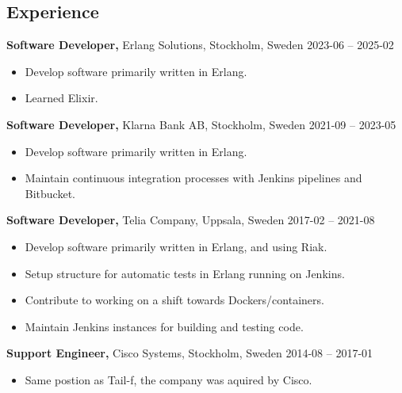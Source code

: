 \documentclass[margin]{res}
\begin{document}

\address{{\bf Contact information}\\
  
  linkedin.com/in/tommymattsson\\
  github.com/Taddic\\
}

\address{{\bf Address}\\
  \\
}

\begin{resume}

\section{Experience}
{\bf Software Developer,} Erlang Solutions, Stockholm, Sweden \hfill 2023-06 -- 2025-02
 \begin{itemize} \itemsep -2pt  %
 \item Develop software primarily written in Erlang.
 \item Learned Elixir.
 \end{itemize}

{\bf Software Developer,} Klarna Bank AB, Stockholm, Sweden \hfill 2021-09 -- 2023-05
 \begin{itemize} \itemsep -2pt  %
 \item Develop software primarily written in Erlang.
 \item Maintain continuous integration processes with Jenkins pipelines and Bitbucket.
 \end{itemize}

{\bf Software Developer,} Telia Company, Uppsala, Sweden \hfill 2017-02 -- 2021-08
 \begin{itemize} \itemsep -2pt  %
 \item Develop software primarily written in Erlang, and using Riak.
 \item Setup structure for automatic tests in Erlang running on Jenkins.
 \item Contribute to working on a shift towards Dockers/containers.
 \item Maintain Jenkins instances for building and testing code.
 \end{itemize}

{\bf Support Engineer,} Cisco Systems, Stockholm, Sweden \hfill 2014-08 -- 2017-01
 \begin{itemize} \itemsep -2pt  %
 \item Same postion as Tail-f, the company was aquired by Cisco.
 \end{itemize}


\end{resume}
\end{document}

